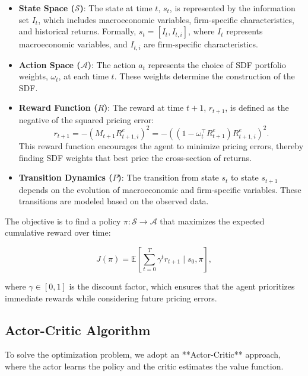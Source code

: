 \begin{itemize}
    \item \textbf{State Space ($\mathcal{S}$)}: The state at time $t$, $s_t$, is represented by the information set $I_t$, which includes macroeconomic variables, firm-specific characteristics, and historical returns. Formally, $s_t = [I_t, I_{t, i}]$, where $I_t$ represents macroeconomic variables, and $I_{t, i}$ are firm-specific characteristics.
    \item \textbf{Action Space ($\mathcal{A}$)}: The action $a_t$ represents the choice of SDF portfolio weights, $\omega_t$, at each time $t$. These weights determine the construction of the SDF.
    \item \textbf{Reward Function ($R$)}: The reward at time $t+1$, $r_{t+1}$, is defined as the negative of the squared pricing error:
    \begin{equation}
        r_{t+1} = -\left( M_{t+1} R_{t+1, i}^e \right)^2 = -\left( \left( 1 - \omega_t^{\top} R_{t+1}^e \right) R_{t+1, i}^e \right)^2.
    \end{equation}
    This reward function encourages the agent to minimize pricing errors, thereby finding SDF weights that best price the cross-section of returns.
    \item \textbf{Transition Dynamics ($P$)}: The transition from state $s_t$ to state $s_{t+1}$ depends on the evolution of macroeconomic and firm-specific variables. These transitions are modeled based on the observed data.
\end{itemize}

The objective is to find a policy $\pi: \mathcal{S} \rightarrow \mathcal{A}$ that maximizes the expected cumulative reward over time:

\begin{equation}
    J(\pi) = \mathbb{E}\left[ \sum_{t=0}^{T} \gamma^t r_{t+1} \mid s_0, \pi \right],
\end{equation}

where $\gamma \in [0, 1]$ is the discount factor, which ensures that the agent prioritizes immediate rewards while considering future pricing errors.

\subsection{Actor-Critic Algorithm}
To solve the optimization problem, we adopt an **Actor-Critic** approach, where the actor learns the policy and the critic estimates the value function.

